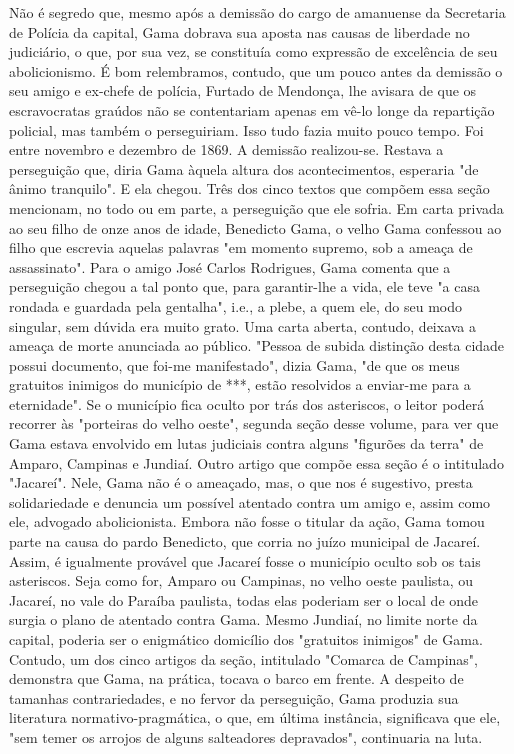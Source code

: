 {\small\noindent
Não é segredo que, mesmo após a demissão do cargo de amanuense da
Secretaria de Polícia da capital, Gama dobrava sua aposta nas causas de
liberdade no judiciário, o que, por sua vez, se constituía como
expressão de excelência de seu abolicionismo. É bom relembramos,
contudo, que um pouco antes da demissão o seu amigo e ex-chefe de
polícia, Furtado de Mendonça, lhe avisara de que os escravocratas
graúdos não se contentariam apenas em vê-lo longe da repartição
policial, mas também o perseguiriam. Isso tudo fazia muito pouco tempo.
Foi entre novembro e dezembro de 1869. A demissão realizou-se. Restava a
perseguição que, diria Gama àquela altura dos acontecimentos, esperaria
"de ânimo tranquilo". E ela chegou. Três dos cinco textos que compõem
essa seção mencionam, no todo ou em parte, a perseguição que ele sofria.
Em carta privada ao seu filho de onze anos de idade, Benedicto Gama, o
velho Gama confessou ao filho que escrevia aquelas palavras "em momento
supremo, sob a ameaça de assassinato". Para o amigo José Carlos
Rodrigues, Gama comenta que a perseguição chegou a tal ponto que, para
garantir-lhe a vida, ele teve "a casa rondada e guardada pela gentalha",
i.e., a plebe, a quem ele, do seu modo singular, sem dúvida era muito
grato. Uma carta aberta, contudo, deixava a ameaça de morte anunciada ao
público. "Pessoa de subida distinção desta cidade possui documento, que
foi-me manifestado", dizia Gama, "de que os meus gratuitos inimigos do
município de ***, estão resolvidos a enviar-me para a eternidade". Se o
município fica oculto por trás dos asteriscos, o leitor poderá recorrer
às "porteiras do velho oeste", segunda seção desse volume, para ver que
Gama estava envolvido em lutas judiciais contra alguns "figurões da
terra" de Amparo, Campinas e Jundiaí. Outro artigo que compõe essa seção
é o intitulado "Jacareí". Nele, Gama não é o ameaçado, mas, o que nos é
sugestivo, presta solidariedade e denuncia um possível atentado contra
um amigo e, assim como ele, advogado abolicionista. Embora não fosse o
titular da ação, Gama tomou parte na causa do pardo Benedicto, que
corria no juízo municipal de Jacareí. Assim, é igualmente provável que
Jacareí fosse o município oculto sob os tais asteriscos. Seja como for,
Amparo ou Campinas, no velho oeste paulista, ou Jacareí, no vale do
Paraíba paulista, todas elas poderiam ser o local de onde surgia o plano
de atentado contra Gama. Mesmo Jundiaí, no limite norte da capital,
poderia ser o enigmático domicílio dos "gratuitos inimigos" de Gama.
Contudo, um dos cinco artigos da seção, intitulado "Comarca de
Campinas", demonstra que Gama, na prática, tocava o barco em frente. A
despeito de tamanhas contrariedades, e no fervor da perseguição, Gama
produzia sua literatura normativo-pragmática, o que, em última
instância, significava que ele, "sem temer os arrojos de alguns
salteadores depravados", continuaria na luta. }

